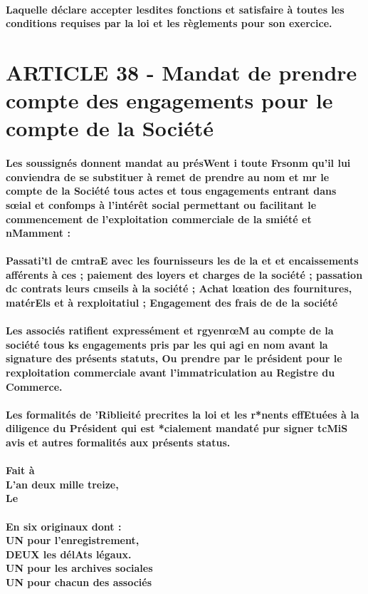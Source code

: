 \documentclass[a4paper, 11pt]{article}
\begin{document}
\paragraph{
  Laquelle déclare accepter lesdites fonctions et satisfaire à toutes les conditions requises par la loi et les règlements pour son exercice.
}

\section*{ARTICLE 38 - Mandat de prendre compte des engagements pour le compte de la Société}

\paragraph{
  Les soussignés donnent mandat au présWent i toute Frsonm qu'il lui conviendra de se substituer à remet de prendre au nom et mr le compte de la Société tous actes et tous engagements entrant dans sœial et confomps à l'intérêt social permettant ou facilitant le commencement de l'exploitation commerciale de la smiété et nMamment :
}

\paragraph{
  Passati'tl de cmtraE avec les fournisseurs les de la et et encaissements afférents à ces ;
  paiement des loyers et charges de la société ;
  passation dc contrats leurs cmseils à la société ;
  Achat lœation des fournitures, matérEls et à rexploitatiul ;
  Engagement des frais de de la société
}

\paragraph{
  Les associés ratifient expressément et rgyenrœM au compte de la société tous ks engagements pris par les qui agi en nom avant la signature des présents statuts, Ou prendre par le président pour le rexploitation commerciale avant l'immatriculation au Registre du Commerce.
}

\paragraph{
  Les formalités de 'Riblieité precrites la loi et les r*nents effEtuées à la diligence du Président qui est *cialement mandaté pur signer tcMiS avis et autres formalités aux présents status.
}

\paragraph{
  Fait à\\
  L'an deux mille treize,\\
  Le
}

\paragraph{
  En six originaux dont :\\
  UN pour l'enregistrement,\\
  DEUX les délAts légaux.\\
  UN pour les archives sociales\\
  UN pour chacun des associés
}
\end{document}
